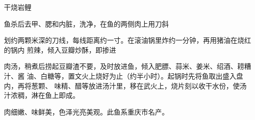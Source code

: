 \begin{recipe}{干烧岩鲤}

\ingredients


\preparation

鱼杀后去甲、腮和内脏，洗净，在鱼的两侧肉上用刀斜

划约两颗米深的刀线，每线距离约一寸。在滚油锅里炸约一分钟，再用猪油在烧红的锅内
煎辣，倾入豆瓣炒酥，即掺进

肉汤，稍煮后捞起豆瓣渣不要，及时放进鱼，倾入肥膘、蒜米、姜米、绍酒、耢糟汁、酱
油、白糖等，置文火上烧好为止（约半小时）。起锅时先将鱼取出盛入盘内，再将葱颗、
味精、醋等放进汤汁里，移在武火上，烧片刻以收干水份，使汤汁浓稠，淋在鱼上即成。

\features

肉细嫩、味鲜美，色泽光亮美观。此鱼系重庆市名产。

\end{recipe}

